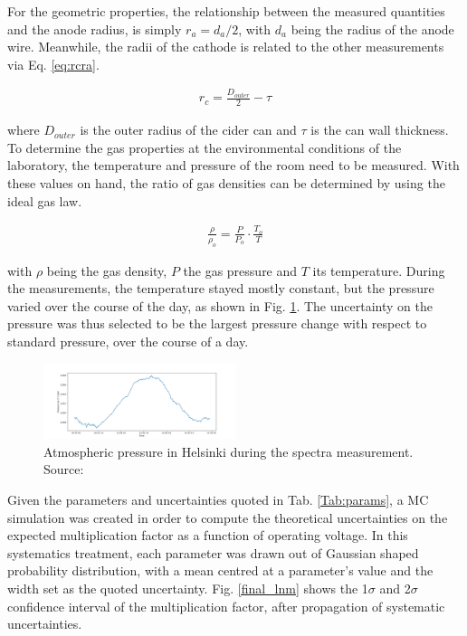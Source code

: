 For the geometric properties, the relationship between the measured quantities and the anode radius, is simply $r_{a} = d_{a}/2$, with $d_{a}$ being the radius of the anode wire. Meanwhile, the radii of the cathode is related to the other measurements via Eq. \ref{eq:rcra}.

\begin{align}
  \label{eq:rcra}
  r_{c} = \frac{D_{outer}}{2}-\tau
\end{align}

where $D_{outer}$ is the outer radius of the cider can and $\tau$ is the can wall thickness.
To determine the gas properties at the environmental conditions of the laboratory, the temperature and pressure of the room need to be measured. With these values on hand, the ratio of gas densities can be determined by using the ideal gas law.

\begin{align}
  \label{eq:gaslaw}
  \frac{\rho}{\rho_{o}} = \frac{P}{P_{o}}\cdot \frac{T_{o}}{T}
\end{align}

with $\rho$ being the gas density, $P$ the gas pressure and $T$ its temperature.
During the measurements, the temperature stayed mostly constant, but the pressure varied over the course of the day, as shown in Fig. \ref{fig:pressure}. The uncertainty on the pressure was thus selected to be the largest pressure change with respect to standard pressure, over the course of a day.

\begin{figure}[htb]
  \includegraphics[width=0.5\textwidth]{graphics/pressure_monitoring.png}
  \caption{Atmospheric pressure in Helsinki during the spectra measurement. Source: \cite{meteo}}
  \label{fig:pressure}
\end{figure}

Given the parameters and uncertainties quoted in Tab. \ref{Tab:params}, a MC simulation was created in order to compute the theoretical uncertainties on the expected multiplication factor as a function of operating voltage. In this systematics treatment, each parameter was drawn out of Gaussian shaped probability distribution, with a mean centred at a parameter's value and the width set as the quoted uncertainty. Fig. \ref{final_lnm} shows the 1$\sigma$ and 2$\sigma$ confidence interval of the multiplication factor, after propagation of systematic uncertainties.

